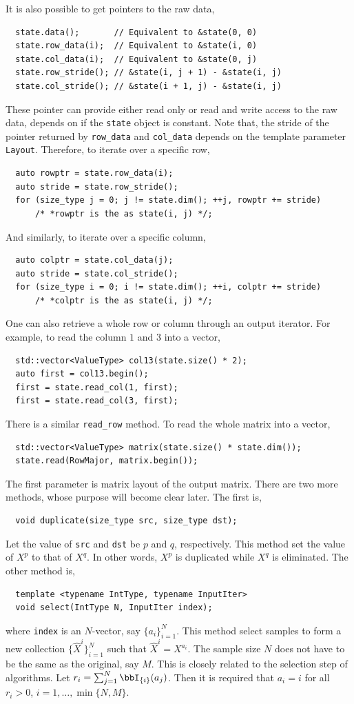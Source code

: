 It is also possible to get pointers to the raw data,
\begin{Verbatim}
  state.data();       // Equivalent to &state(0, 0)
  state.row_data(i);  // Equivalent to &state(i, 0)
  state.col_data(i);  // Equivalent to &state(0, j)
  state.row_stride(); // &state(i, j + 1) - &state(i, j)
  state.col_stride(); // &state(i + 1, j) - &state(i, j)
\end{Verbatim}
These pointer can provide either read only or read and write access to the raw
data, depends on if the \verb|state| object is constant. Note that, the stride
of the pointer returned by \verb|row_data| and \verb|col_data| depends on the
template parameter \verb|Layout|. Therefore, to iterate over a specific row,
\begin{Verbatim}
  auto rowptr = state.row_data(i);
  auto stride = state.row_stride();
  for (size_type j = 0; j != state.dim(); ++j, rowptr += stride)
      /* *rowptr is the as state(i, j) */;
\end{Verbatim}
And similarly, to iterate over a specific column,
\begin{Verbatim}
  auto colptr = state.col_data(j);
  auto stride = state.col_stride();
  for (size_type i = 0; i != state.dim(); ++i, colptr += stride)
      /* *colptr is the as state(i, j) */;
\end{Verbatim}
One can also retrieve a whole row or column through an output iterator. For
example, to read the column $1$ and $3$ into a vector,
\begin{Verbatim}
  std::vector<ValueType> col13(state.size() * 2);
  auto first = col13.begin();
  first = state.read_col(1, first);
  first = state.read_col(3, first);
\end{Verbatim}
There is a similar \verb|read_row| method. To read the whole matrix into a
vector,
\begin{Verbatim}
  std::vector<ValueType> matrix(state.size() * state.dim());
  state.read(RowMajor, matrix.begin());
\end{Verbatim}
The first parameter is matrix layout of the output matrix. There are two more
methods, whose purpose will become clear later. The first is,
\begin{Verbatim}
  void duplicate(size_type src, size_type dst);
\end{Verbatim}
Let the value of \verb|src| and \verb|dst| be $p$ and $q$, respectively. This
method set the value of $X^p$ to that of $X^q$. In other words, $X^p$ is
duplicated while $X^q$ is eliminated. The other method is,
\begin{Verbatim}
  template <typename IntType, typename InputIter>
  void select(IntType N, InputIter index);
\end{Verbatim}
where \verb|index| is an $N$-vector, say $\{a_i\}_{i=1}^N$. This method select
samples to form a new collection $\{\hat{X}^i\}_{i=1}^N$ such that $\hat{X}^i =
X^{a_i}$. The sample size $N$ does not have to be the same as the original, say
$M$. This is closely related to the selection step of \smc algorithms. Let $r_i
= \sum_{j = 1}^N\bbI_{\{i\}}(a_j)$. Then it is required that $a_i = i$ for all
$r_i > 0$, $i = 1,\dots,\min\{N, M\}$.


